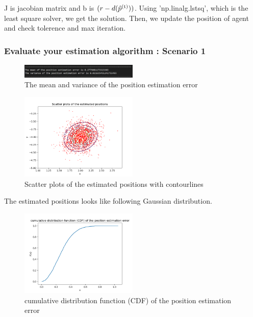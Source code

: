 \documentclass[a4paper]{article}
\begin{document}
J is jacobian matrix and b is $(r-d(\hat{p}\textsuperscript{(t)}))$.
Using 'np.linalg.lstsq', which is the least square solver, we get the solution. Then, we update the position of agent and check tolerence and max iteration.

\clearpage
\subsubsection{Evaluate your estimation algorithm : Scenario 1}
\begin{figure}[h]
	\begin{center}
		\includegraphics[width=0.5\textwidth]{mean_variance_error1.jpg}
		\caption{The mean and variance of the position estimation error}
	\end{center}
\end{figure}
\begin{figure}[h]
	\begin{center}
		\includegraphics[width=0.5\textwidth]{plotcon1.png}
		\caption{Scatter plots of the estimated positions with contourlines}
	\end{center}
\end{figure}
The estimated positions looks like following Gaussian distribution.
\begin{figure}[h]
	\begin{center}		
		\includegraphics[width=0.5\textwidth]{CDF1.png}
		\caption{cumulative distribution function (CDF) of the position estimation error}
	\end{center}
\end{figure}
\end{document}
